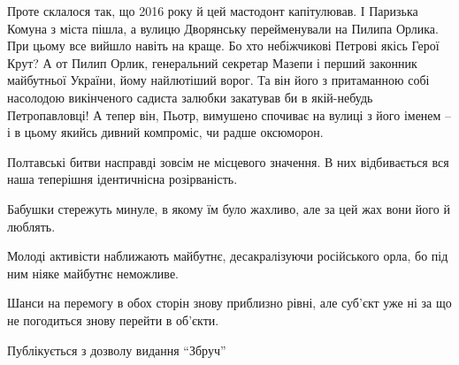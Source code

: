 Проте склалося так, що 2016 року й цей мастодонт капітулював. І Паризька Комуна
з міста пішла, а вулицю Дворянську перейменували на Пилипа Орлика. При цьому
все вийшло навіть на краще. Бо хто небіжчикові Петрові якісь Герої Крут? А от
Пилип Орлик, генеральний секретар Мазепи і перший законник майбутньої України,
йому найлютіший ворог. Та він його з притаманною собі насолодою викінченого
садиста залюбки закатував би в якій-небудь Петропавловці! А тепер він, Пьотр,
вимушено спочиває на вулиці з його іменем – і в цьому якийсь дивний компроміс,
чи радше оксюморон.

Полтавські битви насправді зовсім не місцевого значення. В них відбивається вся
наша теперішня ідентичнісна розірваність.

Бабушки стережуть минуле, в якому їм було жахливо, але за цей жах вони його й
люблять.

Молоді активісти наближають майбутнє, десакралізуючи російського орла, бо під
ним ніяке майбутнє неможливе.

Шанси на перемогу в обох сторін знову приблизно рівні, але суб'єкт уже ні за що
не погодиться знову перейти в об'єкти.

Публікується з дозволу видання \enquote{Збруч}
